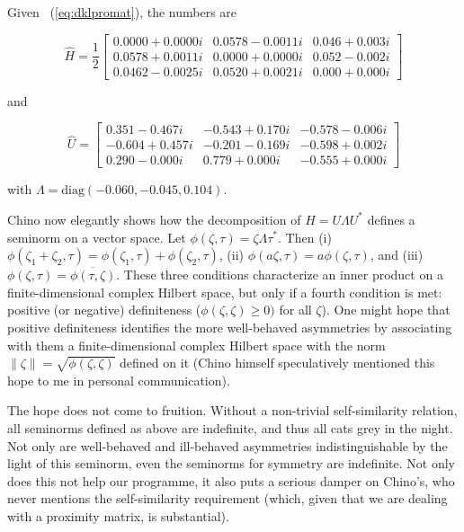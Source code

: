 \documentclass[phd,12pt,oneside]{ubcthesis}
\begin{document}
Given {\xample}~(\ref{eq:dklpromat}), the numbers are
 
\begin{equation}
  \label{eq:dklh}
\hat{H}=\frac{1}{2}\left[
      \begin{array}{ccc}
   0.0000 + 0.0000i &  0.0578 - 0.0011i &  0.046 + 0.003i \\
   0.0578 + 0.0011i &  0.0000 + 0.0000i &  0.052 - 0.002i \\
   0.0462 - 0.0025i &  0.0520 + 0.0021i &  0.000 + 0.000i
      \end{array}
\right]
\end{equation}

{\noindent}and

\begin{equation}
  \label{eq:dklu}
\hat{U}=\left[
      \begin{array}{ccc}
   0.351 - 0.467i & -0.543 + 0.170i & -0.578 - 0.006i \\
  -0.604 + 0.457i & -0.201 - 0.169i & -0.598 + 0.002i \\
   0.290 - 0.000i &  0.779 + 0.000i & -0.555 + 0.000i
      \end{array}
\right]
\end{equation}

{\noindent}with $\Lambda=\mbox{diag}(-0.060,-0.045,0.104)$. 

Chino now elegantly shows how the decomposition of $H=U\Lambda{}U^{*}$
defines a seminorm on a vector space. Let
$\phi(\zeta,\tau)=\zeta\Lambda\tau^{*}$. Then (i)
$\phi(\zeta_{1}+\zeta_{2},\tau)=\phi(\zeta_{1},\tau)+\phi(\zeta_{2},\tau)$,
(ii) $\phi(a\zeta,\tau)=a\phi(\zeta,\tau)$, and (iii)
$\phi(\zeta,\tau)=\overline{\phi(\tau,\zeta)}$. These three conditions
characterize an inner product on a finite-dimensional complex Hilbert
space, but only if a fourth condition is met: positive (or negative)
definiteness ($\phi(\zeta,\zeta)\geq{}0)$ for all $\zeta$). One might
hope that positive definiteness identifies the more well-behaved
asymmetries by associating with them a finite-dimensional complex
Hilbert space with the norm $\|\zeta\|=\sqrt{\phi(\zeta,\zeta)}$
defined on it (Chino himself speculatively mentioned this hope to me
in personal communication).

The hope does not come to fruition. Without a non-trivial
self-similarity relation, all seminorms defined as above are
indefinite, and thus all cats grey in the night. Not only are
well-behaved and ill-behaved asymmetries indistinguishable by the
light of this seminorm, even the seminorms for symmetry are
indefinite. Not only does this not help our programme, it also puts a
serious damper on Chino's, who never mentions the self-similarity
requirement (which, given that we are dealing with a proximity matrix,
is substantial).
\end{document}
